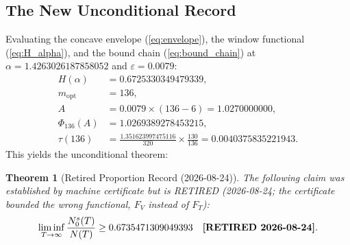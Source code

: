 \documentclass[11pt,a4paper]{article}
\newtheorem{theorem}{Theorem}[section]
\theoremstyle{remark}
\newcommand{\Nc}{N_0^s}
\newcommand{\N}{N}
\newcommand{\eps}{\varepsilon}
\begin{document}
\subsection{The New Unconditional Record}
Evaluating the concave envelope (\ref{eq:envelope}), the window functional (\ref{eq:H_alpha}), and the bound chain (\ref{eq:bound_chain}) at $\alpha = 1.4263026187858052$ and $\eps = 0.0079$:
\begin{align*}
 H(\alpha) &= 0.6725330349479339, \\
 m_{\text{opt}} &= 136, \\
 A &= 0.0079 \times (136 - 6) = 1.0270000000, \\
 \Phi_{136}(A) &= 1.0269389278453215, \\
 \tau(136) &= \frac{1.351623997475116}{320} \times \frac{130}{136} = 0.0040375835221943.
\end{align*}
This yields the unconditional theorem:
\begin{theorem}[Retired Proportion Record (2026-08-24)]\label{thm:proportion_record}
The following claim was established by machine certificate but is RETIRED (2026-08-24; the certificate bounded the wrong functional, $F_V$ instead of $F_T$):
\begin{equation}
 \liminf_{T\to\infty}\frac{\Nc(T)}{\N(T)} \ge 0.6735471309049393 \quad \text{\textbf{[RETIRED 2026-08-24]}}.
\end{equation}
\end{theorem}
\end{document}
